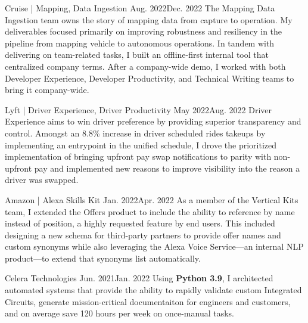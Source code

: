 \documentclass{listofpersonalprofessionalachievements}
\begin{document}
\begin{itemize}
    {Cruise | Mapping, Data Ingestion}
    {Aug. 2022}{Dec. 2022}
    {The Mapping Data Ingestion team owns the story of mapping data from capture to operation. My deliverables focused primarily on improving robustness and resiliency in the pipeline from mapping vehicle to autonomous operations. In tandem with delivering on team-related tasks, I built an offline-first internal tool that centralized company terms. After a company-wide demo, I worked with both Developer Experience, Developer Productivity, and Technical Writing teams to bring it company-wide.}

    {Lyft | Driver Experience, Driver Productivity}
    {May 2022}{Aug. 2022}
    {Driver Experience aims to win driver preference by providing superior transparency and control. Amongst an 8.8\% increase in driver scheduled rides takeups by implementing an entrypoint in the unified schedule, I drove the prioritized implementation of bringing upfront pay swap notifications to parity with non-upfront pay and implemented new reasons to improve visibility into the reason a driver was swapped.}

    {Amazon | Alexa Skills Kit}
    {Jan. 2022}{Apr. 2022}
    {As a member of the Vertical Kits team, I extended the Offers product to include the ability to reference by name instead of position, a highly requested feature by end users. This included designing a new schema for third-party partners to provide offer names and custom synonyms while also leveraging the Alexa Voice Service—an internal NLP product—to extend that synonyms list automatically.}

    {Celera Technologies}
    {Jun. 2021}{Jan. 2022}
    {Using \textbf{Python 3.9}, I architected automated systems that provide the ability to rapidly validate custom Integrated Circuits, generate mission-critical documentaiton for engineers and customers, and on average save 120 hours per week on once-manual tasks.}
\end{itemize}
\end{document}
